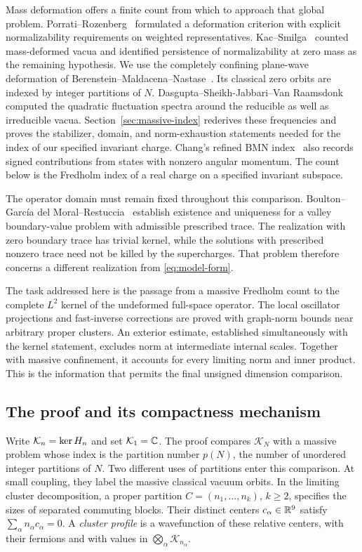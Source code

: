 Mass deformation offers a finite count from which to approach that
global problem. Porrati--Rozenberg~\cite{PorratiRozenberg1998} formulated
a deformation criterion with explicit normalizability requirements on
weighted representatives. Kac--Smilga~\cite{KacSmilga2000} counted
mass-deformed vacua and identified persistence of normalizability at
zero mass as the remaining hypothesis. We use the completely confining
plane-wave deformation of Berenstein--Maldacena--Nastase~\cite{BMN2002}.
Its classical zero orbits are indexed by integer partitions of $N$.
Dasgupta--Sheikh-Jabbari--Van Raamsdonk~\cite{DasguptaSheikhJabbariVanRaamsdonk2002}
computed the quadratic fluctuation spectra around the reducible as well as
irreducible vacua. Section~\ref{sec:massive-index} rederives these
frequencies and proves the stabilizer, domain, and norm-exhaustion
statements needed for the index of our specified invariant charge.
Chang's refined BMN index~\cite[Section~2.2]{Chang2025} also records signed
contributions from states with nonzero angular momentum. The count below
is the Fredholm index of a real charge on a specified invariant subspace.

The operator domain must remain fixed throughout this comparison.
Boulton--Garc\'ia del Moral--Restuccia~\cite[Sections~5--6]{Boulton2021}
establish existence and uniqueness for a valley boundary-value problem
with admissible prescribed trace. The realization with zero boundary trace has trivial
kernel, while the solutions with prescribed nonzero trace need not be
killed by the supercharges. That problem
therefore concerns a different realization from
\eqref{eq:model-form}.

The task addressed here is the passage from a massive Fredholm count
to the complete $L^2$ kernel of the undeformed full-space operator.
The local oscillator projections and fast-inverse corrections are
proved with graph-norm bounds near arbitrary proper clusters.
An exterior estimate, established simultaneously with the kernel
statement, excludes norm at intermediate internal scales. Together
with massive confinement, it accounts for every limiting norm and
inner product. This is the information that permits the final
unsigned dimension comparison.

\subsection{The proof and its compactness mechanism}

Write $\mathcal K_n=\operatorname{ker} H_n$ and set $\mathcal K_1=\mathbb C$. The proof compares
$\mathcal K_N$ with a massive problem whose index is the partition number
$p(N)$, the number of unordered integer partitions of $N$. Two different
uses of partitions enter this comparison. At small coupling, they label
the massive classical vacuum orbits. In the limiting cluster decomposition, a proper
partition $C=(n_1,\ldots,n_k)$, $k\ge2$, specifies the sizes of separated
commuting blocks. Their distinct centers $c_\alpha\in\mathbb R^9$ satisfy
$\sum_\alpha n_\alpha c_\alpha=0$. A \emph{cluster profile} is a
wavefunction of these relative centers, with their fermions and with
values in $\bigotimes_\alpha\mathcal K_{n_\alpha}$.

